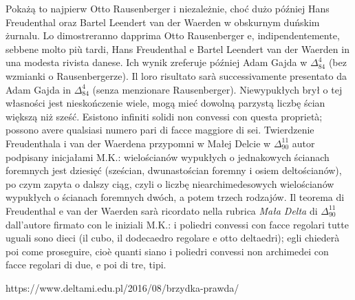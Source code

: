 Pokażą to najpierw Otto Rausenberger \cite{rausenberger_1915} i niezależnie, choć dużo później Hans Freudenthal oraz Bartel Leendert van der Waerden \cite{freudenthal_1947} w obskurnym duńskim żurnalu. %
Lo dimostreranno dapprima Otto Rausenberger \cite{rausenberger_1915} e, indipendentemente, sebbene molto più tardi, Hans Freudenthal e Bartel Leendert van der Waerden \cite{freudenthal_1947} in una modesta rivista danese. %
%
%
Ich wynik zreferuje później Adam Gajda w $\Delta_{84}^{4}$ (bez wzmianki o Rausenbergerze). %
Il loro risultato sarà successivamente presentato da Adam Gajda in $\Delta_{84}^{4}$ (senza menzionare Rausenberger). %
Niewypukłych brył o tej własności jest nieskończenie wiele, mogą mieć dowolną parzystą liczbę ścian większą niż sześć. %
Esistono infiniti solidi non convessi con questa proprietà; possono avere qualsiasi numero pari di facce maggiore di sei. %
Twierdzenie Freudenthala i van der Waerdena przypomni w Małej Delcie w $\Delta_{90}^{11}$ autor podpisany inicjałami M.K.: wielościanów wypukłych o jednakowych ścianach foremnych jest dziesięć (sześcian, dwunastościan foremny i osiem deltościanów), po czym zapyta o dalszy ciąg, czyli o liczbę niearchimedesowych wielościanów wypukłych o ścianach foremnych dwóch, a potem trzech rodzajów. %
Il teorema di Freudenthal e van der Waerden sarà ricordato nella rubrica \emph{Mała Delta} di $\Delta_{90}^{11}$ dall'autore firmato con le iniziali M.K.: i poliedri convessi con facce regolari tutte uguali sono dieci (il cubo, il dodecaedro regolare e otto deltaedri); egli chiederà poi come proseguire, cioè quanti siano i poliedri convessi non archimedei con facce regolari di due, e poi di tre, tipi. %

https://www.deltami.edu.pl/2016/08/brzydka-prawda/

%